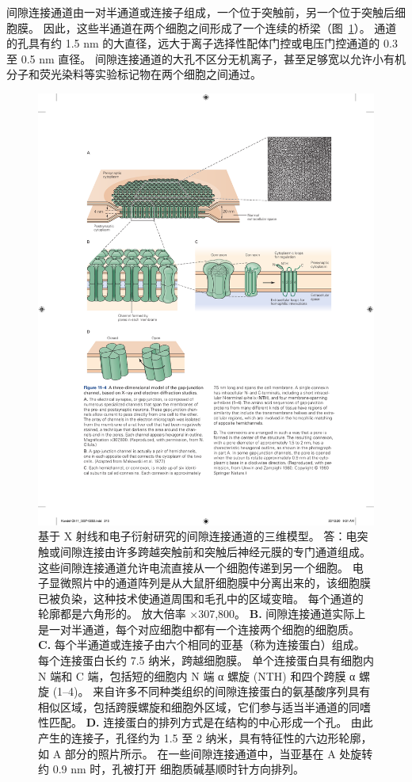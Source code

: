 间隙连接通道由一对半通道或连接子组成，一个位于突触前，另一个位于突触后细胞膜。
因此，这些半通道在两个细胞之间形成了一个连续的桥梁（图~\ref{fig:11_4}）。
通道的孔具有约 1.5 nm 的大直径，远大于离子选择性配体门控或电压门控通道的 0.3 至 0.5 nm 直径。
间隙连接通道的大孔不区分无机离子，甚至足够宽以允许小有机分子和荧光染料等实验标记物在两个细胞之间通过。


\begin{figure}[htbp]
	\centering
	\includegraphics[width=0.9\linewidth]{chap11/fig_11_4}
	\caption{基于 X 射线和电子衍射研究的间隙连接通道的三维模型。
		答：电突触或间隙连接由许多跨越突触前和突触后神经元膜的专门通道组成。
		这些间隙连接通道允许电流直接从一个细胞传递到另一个细胞。
		电子显微照片中的通道阵列是从大鼠肝细胞膜中分离出来的，该细胞膜已被负染，这种技术使通道周围和毛孔中的区域变暗。
		每个通道的轮廓都是六角形的。
		放大倍率 ×307,800。
		\textbf{B.} 间隙连接通道实际上是一对半通道，每个对应细胞中都有一个连接两个细胞的细胞质\cite{makowski1977gap}。 
		\textbf{C.} 每个半通道或连接子由六个相同的亚基（称为连接蛋白）组成。
		每个连接蛋白长约 7.5 纳米，跨越细胞膜。
		单个连接蛋白具有细胞内 N 端和 C 端，包括短的细胞内 N 端 α 螺旋 (NTH) 和四个跨膜 α 螺旋 (1–4)。
		来自许多不同种类组织的间隙连接蛋白的氨基酸序列具有相似区域，包括跨膜螺旋和细胞外区域，它们参与适当半通道的同嗜性匹配。
		\textbf{D.} 连接蛋白的排列方式是在结构的中心形成一个孔。
		由此产生的连接子，孔径约为 1.5 至 2 纳米，具有特征性的六边形轮廓，如 A 部分的照片所示。
		在一些间隙连接通道中，当亚基在 A 处旋转约 0.9 nm 时，孔被打开 细胞质碱基顺时针方向排列\cite{unwin1980structure}。}
	\label{fig:11_4}
\end{figure}


